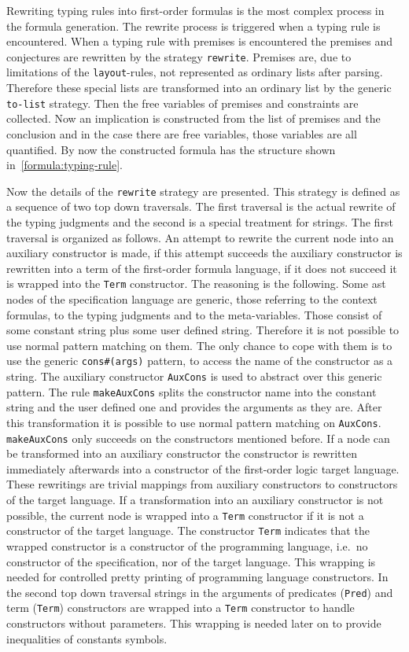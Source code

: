 Rewriting typing rules into first-order formulas is the most complex
process in the formula generation. The rewrite process is triggered
when a typing rule is encountered. When a typing rule with premises is
encountered the premises and conjectures are rewritten by the strategy
\texttt{rewrite}. Premises are, due to limitations of the
\texttt{layout}-rules, not represented as ordinary lists after
parsing. Therefore these special lists are transformed into an
ordinary list by the generic \texttt{to-list} strategy. Then the
free variables of premises and constraints are collected. Now an
implication is constructed from the list of premises and the
conclusion and in the case there are free variables, those variables
are all quantified. By now the constructed formula has the structure
shown in~\ref{formula:typing-rule}.

Now the details of the \texttt{rewrite} strategy are presented. This
strategy is defined as a sequence of two top down traversals. The first
traversal is the actual rewrite of the typing judgments and the second
is a special treatment for strings. The first traversal is organized
as follows. An attempt to rewrite the current node into an auxiliary
constructor is made, if this attempt succeeds the auxiliary
constructor is rewritten into a term of the first-order formula
language, if it does not succeed it is wrapped into the \texttt{Term}
constructor. The reasoning is the following. Some \gls{ast} nodes of the
specification language are generic, those referring to the context
formulas, to the typing judgments and to the meta-variables. Those
consist of some constant string plus some user defined
string. Therefore it is not possible to use normal pattern matching on
them. The only chance to cope with them is to use the generic
\texttt{cons\#(args)} pattern, to access the name of the constructor
as a string. The auxiliary constructor \texttt{AuxCons} is used to
abstract over this generic pattern. The rule \texttt{makeAuxCons}
splits the constructor name into the constant string and the user
defined one and provides the arguments as they are. After this
transformation it is possible to use normal pattern matching on
\texttt{AuxCons}. \texttt{makeAuxCons} only succeeds on the
constructors mentioned before. If a node can be transformed into an
auxiliary constructor the constructor is rewritten immediately
afterwards into a constructor of the first-order logic target
language. These rewritings are trivial mappings from auxiliary
constructors to constructors of the target language. If a
transformation into an auxiliary constructor is not possible, the
current node is wrapped into a \texttt{Term} constructor if it is not
a constructor of the target language. The constructor \texttt{Term}
indicates that the wrapped constructor is a constructor of the
programming language, i.e.\ no constructor of the specification, nor of
the target language. This wrapping is needed for controlled pretty
printing of programming language constructors. In the second top down
traversal strings in the arguments of predicates (\texttt{Pred}) and
term (\texttt{Term}) constructors are wrapped into a \texttt{Term}
constructor to handle constructors without parameters. This wrapping
is needed later on to provide inequalities of constants symbols.

